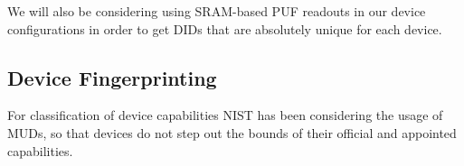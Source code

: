 We will also be considering using SRAM-based PUF readouts in our device configurations in order to get DIDs that are
absolutely unique for each device.

\cite{vinagrero2023sram}


\subsection{Device Fingerprinting} %
\label{sub:Device Fingerprinting}

For classification of device capabilities NIST has been considering the usage of MUDs, so that devices do not step out
the bounds of their official and appointed capabilities. \cite{dodson2021securing}

